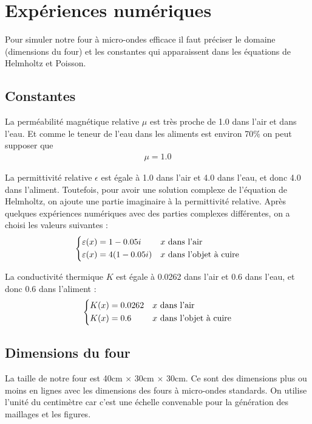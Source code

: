 \section{Expériences numériques}

Pour simuler notre four à micro-ondes efficace il faut préciser le domaine
(dimensions du four) et les constantes qui apparaissent dans les équations de
Helmholtz et Poisson.

\subsection{Constantes}
\label{experiences_numeriques:constantes}

La perméabilité magnétique relative $\mu$ est très proche de
1.0 dans l'air et dans l'eau. Et comme le teneur de l'eau dans les aliments est
environ 70\% on peut supposer que
\begin{align}
    \mu = 1.0
\end{align}

La permittivité relative $\epsilon$ est égale à 1.0 dans l'air et 4.0 dans
l'eau, et donc 4.0 dans l'aliment. Toutefois, pour avoir une solution complexe
de l'équation de Helmholtz, on ajoute une partie imaginaire à la
permittivité relative. Après quelques expériences numériques avec des parties
complexes différentes, on a choisi les valeurs suivantes :
\[\begin{dcases}
    \epsilon(x) = 1 - 0.05i & x \text{ dans l'air} \\
    \epsilon(x) = 4(1 - 0.05i) & x \text{ dans l'objet à cuire}
\end{dcases}\]

La conductivité thermique $K$ est égale à 0.0262 dans l'air et 0.6 dans
l'eau, et donc 0.6 dans l'aliment :
\[\begin{dcases}
      K(x) = 0.0262 & x \text{ dans l'air} \\
      K(x) = 0.6 & x \text{ dans l'objet à cuire}
\end{dcases}\]


\subsection{Dimensions du four}
\label{experiences_numeriques:dimensions_four}

La taille de notre four est 40cm $\times$ 30cm $\times$ 30cm. Ce
sont des dimensions plus ou moins en lignes avec les dimensions
des fours à micro-ondes standards. On utilise l'unité du centimètre
car c'est une échelle convenable pour la génération des maillages
et les figures.

